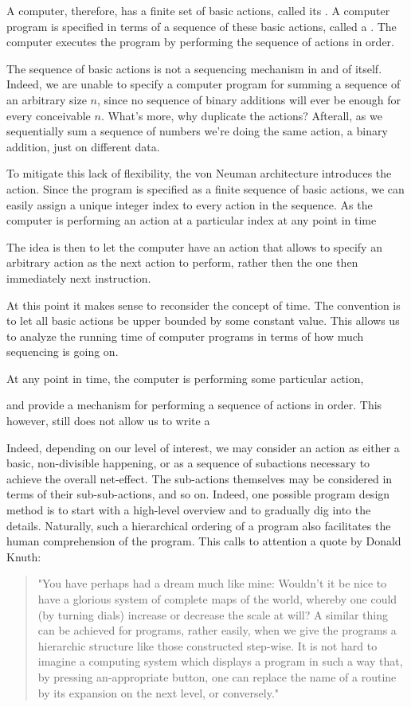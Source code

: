 A computer, therefore, has a finite set of basic actions, called its
. A computer program is specified in terms of a sequence
of these basic actions, called a . The computer executes the
program by performing the sequence of actions in order.

The sequence of basic actions is not a sequencing mechanism in and of itself.
Indeed, we are unable to specify a computer program for summing a sequence of
an arbitrary size $n$, since no sequence of binary additions will ever be
enough for every conceivable $n$.  What's more, why duplicate the actions?
Afterall, as we sequentially sum a sequence of numbers we're doing the same
action, a binary addition, just on different data.

To mitigate this lack of flexibility, the von Neuman architecture introduces
the  action. Since the program is specified as a finite sequence
of basic actions, we can easily assign a unique integer index to every action in the sequence.
As the computer is performing an action at a particular index at any point in time


The
idea is then to let the computer have an action that allows to specify an arbitrary action as
the next action to perform, rather then the one then immediately next
instruction.

At this point it makes sense to reconsider the concept of time. The convention is to let all basic
actions be upper bounded by some constant value. This allows us to analyze the
running time of computer programs in terms of how much sequencing is going on.


At any point in time, the computer is performing some particular action, 

and provide a
mechanism for performing a sequence of actions in order. This however, still does not allow us to write a 

Indeed, depending on our level of interest, we may consider an action as either
a basic, non-divisible happening, or as a sequence of subactions necessary to
achieve the overall net-effect. The sub-actions themselves may be considered in
terms of their sub-sub-actions, and so on. Indeed, one possible program design
method is to start with a high-level overview and to gradually dig into the
details.  Naturally, such a hierarchical ordering of a program also facilitates
the human comprehension of the program. This calls to attention a quote by
Donald Knuth\cite{knuth-review-of-sp}:

\begin{quote}"You have perhaps had a dream much like mine: Wouldn't it be nice
to have a glorious system of complete maps of the world, whereby one could (by
turning dials) increase or decrease the scale at will? A similar thing can be
achieved for programs, rather easily, when we give the programs a hierarchic
structure like those constructed step-wise. It is not hard to imagine a
computing system which displays a program in such a way that, by pressing
an-appropriate button, one can replace the name of a routine by its expansion
on the next level, or conversely."\end{quote}

